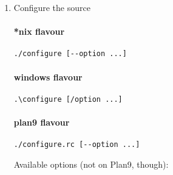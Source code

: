 \begin{enumerate}
\item Configure the source

\paragraph{*nix flavour}
\begin{lstlisting}
./configure [--option ...]
\end{lstlisting}

\paragraph{windows flavour}

\begin{lstlisting}
.\configure [/option ...]
\end{lstlisting}

\paragraph{plan9 flavour}

\begin{lstlisting}
./configure.rc [--option ...]
\end{lstlisting}


Available options (not on Plan9, though):


\end{enumerate}
